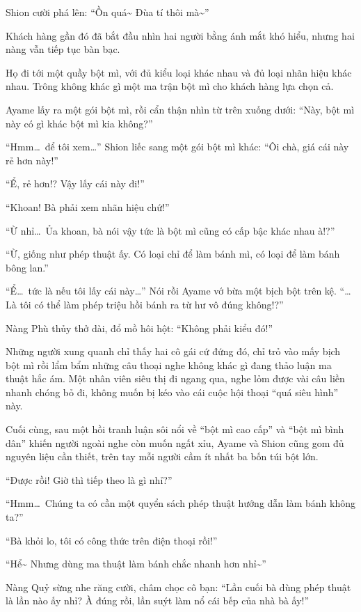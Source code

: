 \documentclass[../main.tex]{subfiles}
\begin{document}
Shion cười phá lên: ``Ồn quá\~{} Đùa tí thôi mà\~{}''

Khách hàng gần đó đã bắt đầu nhìn hai người bằng ánh mắt khó hiểu, nhưng hai nàng vẫn tiếp tục bàn bạc.

\ct

Họ đi tới một quầy bột mì, với đủ kiểu loại khác nhau và đủ loại nhãn hiệu khác nhau. Trông không khác gì một ma trận bột mì cho khách hàng lựa chọn cả.

Ayame lấy ra một gói bột mì, rồi cẩn thận nhìn từ trên xuống dưới: ``Này, bột mì này có gì khác bột mì kia không?''

``Hmm\dots\ để tôi xem\dots'' Shion liếc sang một gói bột mì khác: ``Ôi chà, giá cái này rẻ hơn này!''

``Ể, rẻ hơn!? Vậy lấy cái này đi!''

``Khoan! Bà phải xem nhãn hiệu chứ!''

``Ừ nhỉ\dots\ Ủa khoan, bà nói vậy tức là bột mì cũng có cấp bậc khác nhau à!?''

``Ừ, giống như phép thuật ấy. Có loại chỉ để làm bánh mì, có loại để làm bánh bông lan.''

``Ể\dots\ tức là nếu tôi lấy cái này\dots'' Nói rồi Ayame vớ bừa một bịch bột trên kệ. ``\dots Là tôi có thể làm phép triệu hồi bánh ra từ hư vô đúng không!?''

Nàng Phù thủy thở dài, đổ mồ hôi hột: ``Không phải kiểu đó!''

Những người xung quanh chỉ thấy hai cô gái cứ đứng đó, chỉ trỏ vào mấy bịch bột mì rồi lẩm bẩm những câu thoại nghe không khác gì đang thảo luận ma thuật hắc ám. Một nhân viên siêu thị đi ngang qua, nghe lỏm được vài câu liền nhanh chóng bỏ đi, không muốn bị kéo vào cái cuộc hội thoại ``quá siêu hình'' này.

Cuối cùng, sau một hồi tranh luận sôi nổi về ``bột mì cao cấp'' và ``bột mì bình dân'' khiến người ngoài nghe còn muốn ngất xỉu, Ayame và Shion cũng gom đủ nguyên liệu cần thiết, trên tay mỗi người cầm ít nhất ba bốn túi bột lớn.

``Được rồi! Giờ thì tiếp theo là gì nhỉ?''

``Hmm\dots\ Chúng ta có cần một quyển sách phép thuật hướng dẫn làm bánh không ta?''

``Bà khỏi lo, tôi có công thức trên điện thoại rồi!''

``Hể\~{} Nhưng dùng ma thuật làm bánh chắc nhanh hơn nhỉ\~{}''

Nàng Quỷ sừng nhe răng cười, châm chọc cô bạn: ``Lần cuối bà dùng phép thuật là lần nào ấy nhỉ? À đúng rồi, lần suýt làm nổ cái bếp của nhà bà ấy!''
\end{document}
